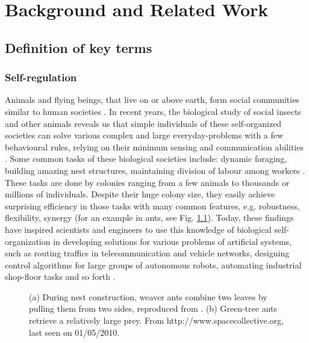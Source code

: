 \chapter{Background and Related Work}
\label{bg}
\section{Definition of key terms}
\subsection{Self-regulation}
\label{bg:def:self-reg}
Animals and flying beings, that live on or above earth, form social communities similar to human societies \cite{SIHQ1995}. In recent years, the biological study of social insects and other animals reveals 
us that simple individuals of these self-organized  societies can solve various complex and large everyday-problems with a few behavioural rules, relying on their minimum sensing and communication abilities \cite{Camazine+2001}. Some common tasks of these biological societies include: dynamic foraging, building amazing nest structures, maintaining division of labour among workers \cite{Bonabeau+1999}. These tasks are done by colonies  ranging from a few animals to thousands or millions of individuals. Despite their huge colony size, they easily achieve surprising efficiency in those tasks with many common features, e.g. robustness, flexibility, synergy (for an example in ants, see Fig. \ref{fig:self-org-ants}). Today, these findings have inspired scientists and engineers to use this knowledge of biological self-organization in developing solutions for various problems of artificial systems, such as  routing traffics in telecommunication and vehicle networks, designing control algorithms for large groups of autonomous robots, automating industrial shop-floor tasks and so forth \cite{Garnier+2007}.\\
\begin{figure}[htp]
  \centering
  \hspace{0.25cm}
  \caption{(a) During nest construction, weaver ants combine two leaves by pulling them from two sides, reproduced from \protect{}.
(b) Green-tree ants retrieve a relatively large prey. \protect\newline From  http://www.spacecollective.org, last seen on 01/05/2010. }
  \label{fig:self-org-ants}
\end{figure}

